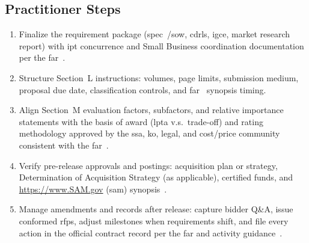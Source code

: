 \documentclass[../main.tex]{subfiles}
\begin{document}
\subsection{Practitioner Steps}
\begin{enumerate}
  \item Finalize the requirement package (spec~/\ac{sow}, \acp{cdrl}, \ac{igce}, market research report) with \ac{ipt} concurrence and Small Business coordination documentation per the \ac{far}~\autocite{FAR,edo-3-2-2-solicitation-prep-2025}.
  \item Structure Section~L instructions: volumes, page limits, submission medium, proposal due date, classification controls, and \ac{far}~\autocite[\S~5.203]{FAR} synopsis timing.
  \item Align Section~M evaluation factors, subfactors, and relative importance statements with the basis of award (\ac{lpta} v.s.\ trade-off) and rating methodology approved by the \ac{ssa}, \ac{ko}, legal, and cost/price community consistent with the \ac{far}~\autocite{FAR,NAVSEA-Source-Selection-Guide-2022}.
  \item Verify pre-release approvals and postings: acquisition plan or strategy, Determination of Acquisition Strategy (as applicable), certified funds, and \url{https://www.SAM.gov} (\ac{sam}) synopsis~\autocite{NMCARS,edo-3-2-2-solicitation-prep-2025}.
  \item Manage amendments and records after release: capture bidder Q\&A, issue conformed \acp{rfp}, adjust milestones when requirements shift, and file every action in the official contract record per the \ac{far} and activity guidance~\autocite{FAR,NAVSEA-Contracts-Handbook-2023}.
\end{enumerate}
\end{document}
